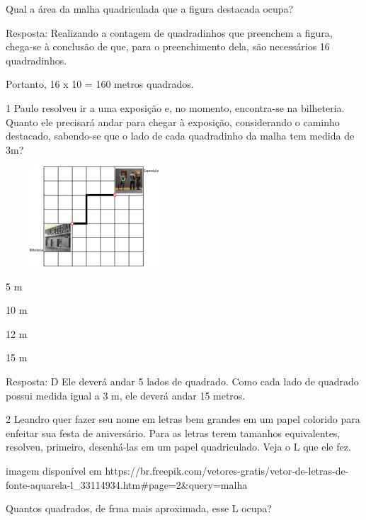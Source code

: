 \begin{escolha}
Qual a área da malha quadriculada que a figura destacada ocupa?


Resposta:
Realizando a contagem de quadradinhos que preenchem a figura, chega-se à conclusão de que, para o preenchimento dela, são necessários 16 quadradinhos.

Portanto, 16 x 10 = 160 metros quadrados.


\num{1} Paulo resolveu ir a uma exposição e, no momento, encontra-se na
bilheteria. Quanto ele precisará andar para chegar à exposição,
considerando o caminho destacado, sabendo-se que o lado de cada
quadradinho da malha tem medida de 3m?


\includegraphics[width=2.60897in,height=1.46587in]{media/image61.png}

\begin{escolha}
\item
  5 m
\item
  10 m
\item
  12 m
\item
  15 m
\end{escolha}

Resposta: D
Ele deverá andar 5 lados de quadrado. Como cada lado de quadrado possui
medida igual a 3 m, ele deverá andar 15 metros.

\num{2} Leandro quer fazer seu nome em letras bem grandes em um papel colorido para enfeitar sua festa de aniversário. Para as letras terem tamanhos equivalentes, resolveu, primeiro, desenhá-las em um papel quadriculado. Veja o L que ele fez.

\Inserir imagem disponível em https://br.freepik.com/vetores-gratis/vetor-de-letras-de-fonte-aquarela-l_33114934.htm#page=2&query=malha%

Quantos quadrados, de frma mais aproximada, esse L ocupa?


\end{escolha}
